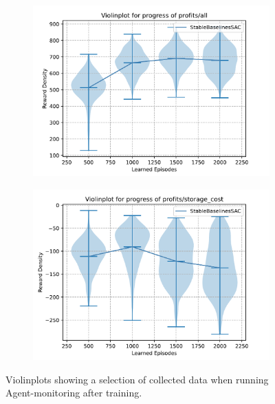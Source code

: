 \begin{figure}[t]
	\centering
	\begin{subfigure}{0.49\textwidth}
		\centering
		\includegraphics[width = \textwidth]{images/experiments/SACDuopoly/SACDuopolyProfitsAllViolin.pdf}\\
		\label{fig:SACDuopolyViolinPlots1}
	\end{subfigure}
	\begin{subfigure}{0.49\textwidth}
		\centering
		\includegraphics[width = \textwidth]{images/experiments/SACDuopoly/SACDuopolyStorageCostsViolin.pdf}\\
		\label{fig:SACDuopolyViolinPlots2}
	\end{subfigure}
	\caption{Violinplots showing a selection of collected data when running Agent-monitoring after training.}\label{fig:SACDuopolyViolinPlots}
\end{figure}

